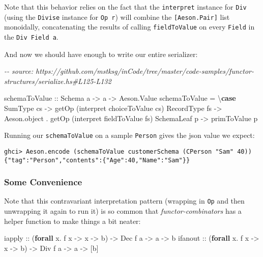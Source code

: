 \documentclass[]{article}
\newenvironment{Shaded}{}{}
\newcommand{\CommentTok}[1]{\textcolor[rgb]{0.38,0.63,0.69}{\textit{#1}}}
\newcommand{\DataTypeTok}[1]{\textcolor[rgb]{0.56,0.13,0.00}{#1}}
\newcommand{\KeywordTok}[1]{\textcolor[rgb]{0.00,0.44,0.13}{\textbf{#1}}}
\newcommand{\NormalTok}[1]{#1}
\newcommand{\OperatorTok}[1]{\textcolor[rgb]{0.40,0.40,0.40}{#1}}
\newcommand{\OtherTok}[1]{\textcolor[rgb]{0.00,0.44,0.13}{#1}}
\begin{document}
Note that this behavior relies on the fact that the \texttt{interpret} instance
for \texttt{Div} (using the \texttt{Divise} instance for \texttt{Op\ r}) will
combine the \texttt{{[}Aeson.Pair{]}} list monoidally, concatenating the results
of calling \texttt{fieldToValue} on every \texttt{Field} in the
\texttt{Div\ Field\ a}.

And now we should have enough to write our entire serializer:

\begin{Shaded}
\begin{Highlighting}[]
\CommentTok{{-}{-} source: https://github.com/mstksg/inCode/tree/master/code{-}samples/functor{-}structures/serialize.hs\#L125{-}L132}

\NormalTok{schemaToValue}
\OtherTok{    ::} \DataTypeTok{Schema}\NormalTok{ a}
    \OtherTok{{-}>}\NormalTok{ a}
    \OtherTok{{-}>} \DataTypeTok{Aeson.Value}
\NormalTok{schemaToValue }\OtherTok{=}\NormalTok{ \textbackslash{}}\KeywordTok{case}
    \DataTypeTok{SumType}\NormalTok{    cs }\OtherTok{{-}>}\NormalTok{ getOp (interpret choiceToValue cs)}
    \DataTypeTok{RecordType}\NormalTok{ fs }\OtherTok{{-}>}\NormalTok{ Aeson.object }\OperatorTok{.}\NormalTok{ getOp (interpret fieldToValue fs)}
    \DataTypeTok{SchemaLeaf}\NormalTok{ p  }\OtherTok{{-}>}\NormalTok{ primToValue p}
\end{Highlighting}
\end{Shaded}

Running our \texttt{schemaToValue} on a sample \texttt{Person} gives the json
value we expect:

\begin{verbatim}
ghci> Aeson.encode (schemaToValue customerSchema (CPerson "Sam" 40))
{"tag":"Person","contents":{"Age":40,"Name":"Sam"}}
\end{verbatim}

\hypertarget{some-convenience}{%
\subsubsection{Some Convenience}\label{some-convenience}}

Note that this contravariant interpretation pattern (wrapping in \texttt{Op} and
then unwrapping it again to run it) is so common that \emph{functor-combinators}
has a helper function to make things a bit neater:

\begin{Shaded}
\begin{Highlighting}[]
\OtherTok{iapply  ::}\NormalTok{ (}\KeywordTok{forall}\NormalTok{ x}\OperatorTok{.}\NormalTok{ f x }\OtherTok{{-}>}\NormalTok{ x }\OtherTok{{-}>}\NormalTok{ b) }\OtherTok{{-}>} \DataTypeTok{Dec}\NormalTok{ f a }\OtherTok{{-}>}\NormalTok{ a }\OtherTok{{-}>}\NormalTok{ b}
\OtherTok{ifanout ::}\NormalTok{ (}\KeywordTok{forall}\NormalTok{ x}\OperatorTok{.}\NormalTok{ f x }\OtherTok{{-}>}\NormalTok{ x }\OtherTok{{-}>}\NormalTok{ b) }\OtherTok{{-}>} \DataTypeTok{Div}\NormalTok{ f a }\OtherTok{{-}>}\NormalTok{ a }\OtherTok{{-}>}\NormalTok{ [b]}
\end{Highlighting}
\end{Shaded}
\end{document}
